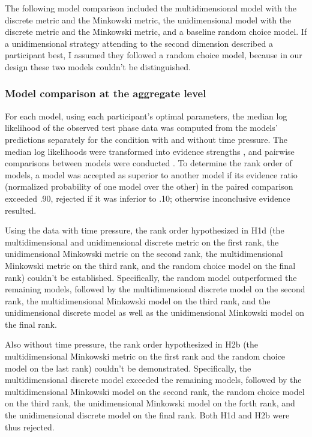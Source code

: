 \documentclass[a4paper,man,natbib]{apa6}
\begin{document}
The following model comparison included the multidimensional model with the discrete metric and the Minkowski metric, the unidimensional model with the discrete metric and the Minkowski metric, and a baseline random choice model. If a unidimensional strategy attending to the second dimension described a participant best, I assumed they followed a random choice model, because in our design these two models couldn't be distinguished. 

\subsubsection{Model comparison at the aggregate level} \label{sec:res_agg}
For each model, using each participant's optimal parameters, the median log likelihood of the observed test phase data was computed from the models' predictions separately for the condition with and without time pressure. The median log likelihoods were transformed into evidence strengths \citep[Akake weights,][]{wagenmakers2004aic}, and pairwise comparisons between models were conducted \citep[as in][p. 194]{wagenmakers2004aic}. To determine the rank order of models, a model was accepted as superior to another model if its evidence ratio (normalized probability of one model over the other) in the paired comparison exceeded .90, rejected if it was inferior to .10; otherwise inconclusive evidence resulted. 

Using the data with time pressure, the rank order hypothesized in H1d (the multidimensional and unidimensional discrete metric on the first rank, the unidimensional Minkowski metric on the second rank, the multidimensional Minkowski metric on the third rank, and the random choice model on the final rank) couldn't be established. Specifically, the random model outperformed the remaining models, followed by the multidimensional discrete model on the second rank, the multidimensional Minkowski model on the third rank, and the unidimensional discrete model as well as the unidimensional Minkowski model on the final rank. 

Also without time pressure, the rank order hypothesized in H2b (the multidimensional Minkowski metric on the first rank and the random choice model on the last rank) couldn't be demonstrated. Specifically, the multidimensional discrete model exceeded the remaining models, followed by the multidimensional Minkowski model on the second rank, the random choice model on the third rank, the unidimensional Minkowski model on the forth rank, and the unidimensional discrete model on the final rank. Both H1d and H2b were thus rejected.
\end{document}
